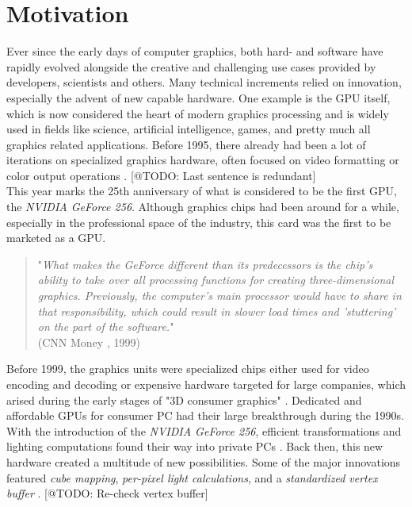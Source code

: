 \chapter{Motivation} \label{cpt-motivation}


Ever since the early days of computer graphics, both hard- and software have rapidly evolved
alongside the creative and challenging use cases provided by developers, scientists and others.
Many technical increments relied on innovation, especially the advent of new capable hardware.
One example is the \ac{GPU} itself, which is now considered the heart of modern graphics 
processing and is widely used in fields like science, artificial intelligence, games, and pretty 
much all graphics related applications. Before 1995, there already had been a lot of iterations 
on specialized graphics hardware, often focused on video formatting or color output operations
\cite{Singer2023}. [@TODO: Last sentence is redundant]\\

This year marks the 25th anniversary of what is considered to be the first \ac{GPU}, the 
\emph{NVIDIA GeForce 256}. Although graphics chips had been around for a while, especially 
in the professional space of the industry, this card was the first to be marketed as a \ac{GPU}. 

\begin{quote}
    "\emph{What makes the GeForce different than its predecessors is the chip's ability to take over all 
    processing functions for creating three-dimensional graphics. Previously, the computer's main 
    processor would have to share in that responsibility, which could result in slower load times 
    and 'stuttering' on the part of the software.}" \\  
    (CNN Money \cite{CNNMoney1999}, 1999)
\end{quote}

\noindent
Before 1999, the graphics units were specialized chips either used for video encoding and decoding
or expensive hardware targeted for large companies, which arised during the early stages of "3D 
consumer graphics" \cite{Singer2023}. Dedicated and affordable \ac{GPU}s for consumer \ac{PC} had 
their large breakthrough during the 1990s. With the introduction of the \emph{NVIDIA GeForce 256}, 
efficient transformations and lighting computations found their way into private \ac{PC}s 
\cite{Fenno2024}. Back then, this new hardware created a multitude of new possibilities. Some of the 
major innovations featured \emph{cube mapping}, \emph{per-pixel light calculations}, and a 
\emph{standardized vertex buffer} \cite{NVIDIA1999, Battaglia2024}. [@TODO: Re-check vertex buffer] \\


